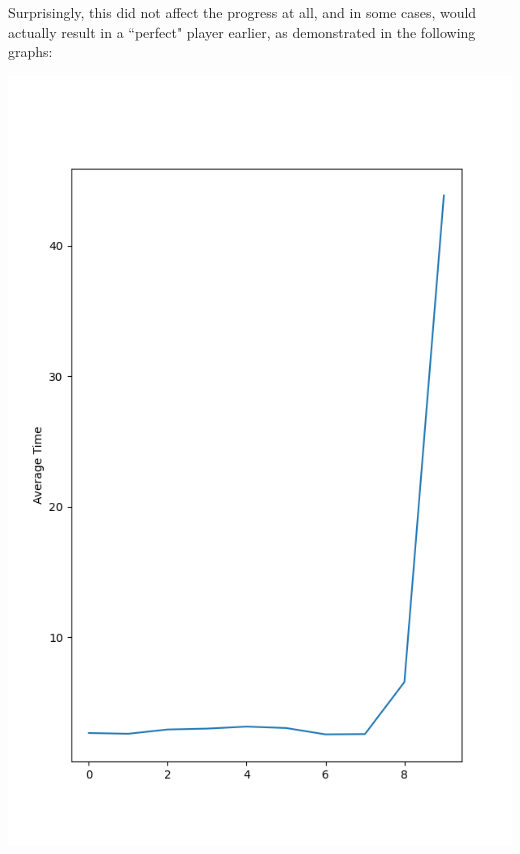 \documentclass[12pt]{article}
\begin{document}
\begin{flushleft}
Surprisingly, this did not affect the progress at all, and in some cases, would actually result in a ``perfect" player earlier, as demonstrated in the following graphs:

\includegraphics[scale=.4]{Figure_4.png}

\end{flushleft}
\end{document}

